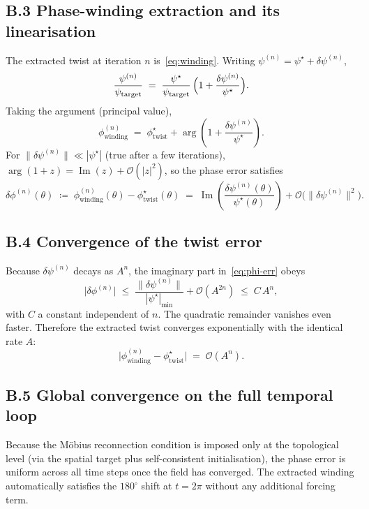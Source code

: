 \documentclass[11pt,a4paper]{article}
\theoremstyle{definition}
\theoremstyle{remark}
\newcommand{\psit}{\psi_{\mathrm{target}}}
\newcommand{\Img}{\operatorname{Im}}
\begin{document}
\subsection*{B.3 Phase-winding extraction and its linearisation}
The extracted twist at iteration $n$ is~\eqref{eq:winding}. Writing
$\psi^{(n)} = \psi^\star + \delta\psi^{(n)}$,
\begin{equation}
  \frac{\psi^{(n)}}{\psit}
  \;=\; \frac{\psi^\star}{\psit}\,
        \Bigl(1 + \frac{\delta\psi^{(n)}}{\psi^\star}\Bigr).
\end{equation}
Taking the argument (principal value),
\begin{equation}\label{eq:lin-arg}
  \phi_{\mathrm{winding}}^{(n)}
    \;=\; \phi_{\mathrm{twist}}^\star
        + \arg\!\left(1 + \frac{\delta\psi^{(n)}}{\psi^\star}\right).
\end{equation}
For $\|\delta\psi^{(n)}\| \ll |\psi^\star|$ (true after a few iterations),
$\arg(1 + z) = \Img(z) + \mathcal{O}(|z|^2)$, so the phase error
satisfies
\begin{equation}\label{eq:phi-err}
  \delta\phi^{(n)}(\theta)
  \;\coloneqq\; \phi_{\mathrm{winding}}^{(n)}(\theta)
    - \phi_{\mathrm{twist}}^\star(\theta)
  \;=\; \Img\!\left(\frac{\delta\psi^{(n)}(\theta)}{\psi^\star(\theta)}\right)
    + \mathcal{O}\bigl(\|\delta\psi^{(n)}\|^2\bigr).
\end{equation}

\subsection*{B.4 Convergence of the twist error}
Because $\delta\psi^{(n)}$ decays as $A^n$, the imaginary part
in~\eqref{eq:phi-err} obeys
\begin{equation}\label{eq:twist-decay}
  \bigl|\delta\phi^{(n)}\bigr|
  \;\le\; \frac{\|\delta\psi^{(n)}\|}{|\psi^\star|_{\min}}
      + \mathcal{O}(A^{2n})
  \;\le\; C\,A^n,
\end{equation}
with $C$ a constant independent of $n$. The quadratic remainder
vanishes even faster. Therefore the extracted twist converges
exponentially with the identical rate $A$:
\begin{equation}
  \bigl|\phi_{\mathrm{winding}}^{(n)}
    - \phi_{\mathrm{twist}}^\star\bigr|
  \;=\; \mathcal{O}(A^n).
\end{equation}

\subsection*{B.5 Global convergence on the full temporal loop}
Because the M\"obius reconnection condition is imposed only at the
topological level (via the spatial target plus self-consistent
initialisation), the phase error is uniform across all time steps once
the field has converged. The extracted winding automatically satisfies
the $180^\circ$ shift at $t = 2\pi$ without any additional forcing
term.
\end{document}
